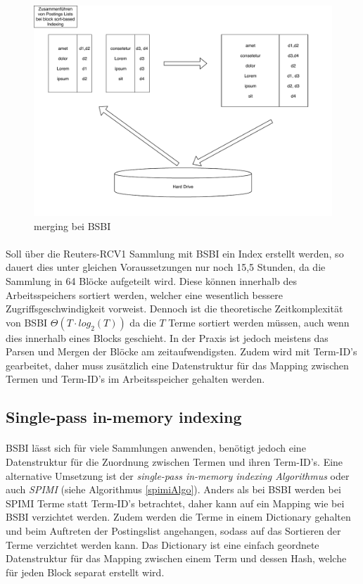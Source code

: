 \begin{figure}[ht]
  \includegraphics[width=\textwidth]{pdf/BSI_merging.pdf}
  \caption{merging bei BSBI}
  \label{bsiMerging}
\end{figure}

\paragraph{}
Soll über die Reuters-RCV1 Sammlung mit BSBI ein Index erstellt werden, so dauert dies unter gleichen Voraussetzungen nur noch 15,5 Stunden, da die Sammlung in 64 Blöcke aufgeteilt wird. Diese können innerhalb des Arbeitsspeichers sortiert werden, welcher eine wesentlich bessere Zugriffsgeschwindigkeit vorweist. Dennoch ist die theoretische Zeitkomplexität von BSBI $\Theta( T\cdot log_2( T))$ da die $T$ Terme sortiert werden müssen, auch wenn dies innerhalb eines Blocks geschieht. In der Praxis ist jedoch meistens das Parsen und Mergen der Blöcke am zeitaufwendigsten. Zudem wird mit Term-ID's gearbeitet, daher muss zusätzlich eine Datenstruktur für das Mapping zwischen Termen und Term-ID's im Arbeitsspeicher gehalten werden.\par

\subsection{Single-pass in-memory indexing}
\paragraph{}
BSBI lässt sich für viele Sammlungen anwenden, benötigt jedoch eine Datenstruktur für die Zuordnung zwischen Termen und ihren Term-ID's. Eine alternative Umsetzung ist der \textit{single-pass in-memory indexing Algorithmus} oder auch \textit{SPIMI} (siehe Algorithmus \ref{spimiAlgo}). Anders als bei BSBI werden bei SPIMI Terme statt Term-ID's betrachtet, daher kann auf ein Mapping wie bei BSBI verzichtet werden. Zudem werden die Terme in einem Dictionary gehalten und beim Auftreten der Postingslist angehangen, sodass auf das Sortieren der Terme verzichtet werden kann. Das Dictionary ist eine einfach geordnete Datenstruktur für das Mapping zwischen einem Term und dessen Hash, welche für jeden Block separat erstellt wird.\par

